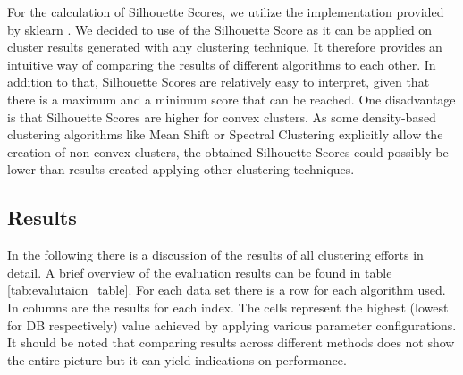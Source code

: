 For the calculation of Silhouette Scores, we utilize the implementation provided by sklearn \cite{sklearn_api}.
We decided to use of the Silhouette Score as it can be applied on cluster results generated with any clustering technique. It therefore provides an intuitive way of comparing the results of different algorithms to each other. In addition to that, Silhouette Scores are relatively easy to interpret, given that there is a maximum and a minimum score that can be reached. One disadvantage is that Silhouette Scores are higher for convex clusters. As some density-based clustering algorithms like Mean Shift or Spectral Clustering explicitly allow the creation of non-convex clusters, the obtained Silhouette Scores could possibly be lower than results created applying other clustering techniques.

\subsection{Results}

In the following there is a discussion of the results of all clustering efforts in detail. A brief overview of the evaluation results can be found in table \ref{tab:evalutaion_table}. For each data set there is a row for each algorithm used. In columns are the results for each index. The cells represent the highest (lowest for \gls{DB} respectively) value achieved by applying various parameter configurations. It should be noted that comparing results across different methods does not show the entire picture but it can yield indications on performance.

